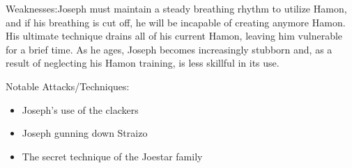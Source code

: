 \documentclass[a4paper,12pt]{article}
\begin{document}
Weaknesses:Joseph must maintain a steady breathing rhythm to utilize Hamon, and if his breathing is cut off, he will be incapable of creating anymore Hamon. His ultimate technique drains all of his current Hamon, leaving him vulnerable for a brief time. As he ages, Joseph becomes increasingly stubborn and, as a result of neglecting his Hamon training, is less skillful in its use.\\ \par \vspace{0.5cm}

Notable Attacks/Techniques:\\ \par \vspace{0.5cm}

\begin{itemize}
\item Joseph's use of the clackers
\item Joseph gunning down Straizo
\item The secret technique of the Joestar family
\end{itemize}\\ \par \vspace{0.5cm}
\end{document}
